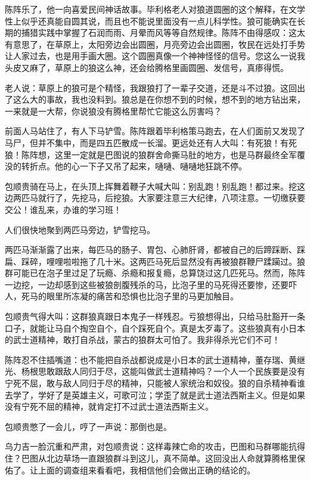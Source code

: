 \par 陈阵乐了，他一向喜爱民间神话故事。毕利格老人对狼道圆圈的这个解释，在文学性上似乎还真能自圆其说，而且也不能说里面没有一点儿科学性。狼可能确实在长期的捕猎实践中掌握了石润而雨、月晕而风等等自然规律。陈阵不由得感叹：这太有意思了，在草原上，太阳旁边会出圆圈，月亮旁边会出圆圈，牧民在远处打手势让人家过去，也是用手画大圈。这个圆圈真像一个神神怪怪的信号。您这么一说我头皮又麻了，草原上的狼这么神，还会给腾格里画圆圈、发信号，真瘆得慌。
\par 老人说：草原上的狼可是个精怪，我跟狼打了一辈子交道，还是斗不过狼。这回出了这么大的事故，我也没料到。狼总是在你想不到的时候，想不到的地方钻出来，一来就是一大帮，你说狼没有腾格里帮忙它能这么厉害吗？
\par 
\par 前面人马站住了，有人下马铲雪。陈阵跟着毕利格策马跑去，在人们面前又发现了马尸，但并不集中，而是四五匹散成一长溜。更远处还有人大叫：有死狼！有死狼！陈阵想，这里一定就是巴图说的狼群舍命撕马肚的地方，也是马群最终全军覆没的转折点。他的心一下子又吊了起来，嗵嗵、嗵嗵地狂跳不停。
\par 包顺贵骑在马上，在头顶上挥舞着鞭子大喊大叫：别乱跑！别乱跑！都过来。挖这边两匹马就行了，先挖马，后挖狼。大家要注意三大纪律，八项注意。一切缴获要交公！谁乱来，办谁的学习班！
\par 人们很快地聚到两匹马旁边，铲雪挖马。
\par 两匹马渐渐露了出来，每匹马的肠子、胃包、心肺肝肾，都被自己的后蹄踩断、踩扁、踩碎，哩哩啦啦拖了几十米。这两匹马死后显然没有再被狼群鞭尸蹂躏过。狼群可能已在泡子里过足了玩瘾、杀瘾和报复瘾，总算饶过这几匹死马。然而，陈阵一边挖，一边却感到这些被狼剖腹残杀的马，比泡子里的马死得还要惨，还要吓人，死马的眼里所冻凝的痛苦和恐惧也比泡子里的马更加触目。
\par 包顺贵气得大叫：这群狼真跟日本鬼子一样残忍。亏狼想得出，只给马肚豁开一条口子，就能让马自个掏空自个，自个踩死自个。真是太歹毒了。这些狼真有小日本的武士道精神，敢打自杀战，蒙古的狼群太可怕了。我非得杀光它们不可！
\par 陈阵忍不住插嘴道：也不能把自杀战都说成是小日本的武士道精神，董存瑞、黄继光、杨根思敢跟敌人同归于尽，这能叫做武士道精神吗？一个人一个民族要是没有宁死不屈，敢与敌人同归于尽的精神，只能被人家统治和奴役。狼的自杀精神看谁去学了，学好了是英雄主义，可歌可泣；学歪了就是武士道法西斯主义。但是如果没有宁死不屈的精神，就肯定打不过武士道法西斯主义。
\par 包顺贵憋了一会儿，哼了一声说：那倒也是。
\par 乌力吉一脸沉重和严肃，对包顺贵说：这样毒辣亡命的攻击，巴图和马群哪能抗得住？巴图从北边草场一直跟狼群斗到这儿，真不简单。这回没出人命就算腾格里保佑了。让上面的调查组来看看吧，我相信他们会做出正确的结论的。
